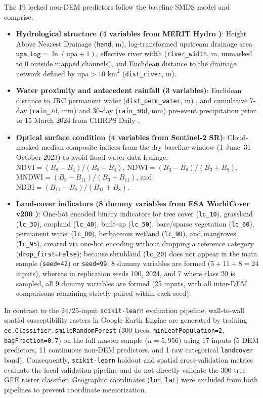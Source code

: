 \documentclass[11pt,twoside]{article}
\begin{document}
The 19 locked non-DEM predictors follow the baseline SMDS model \cite{hakim2026} and comprise:
\begin{itemize}
\item \textbf{Hydrological structure (4 variables from MERIT Hydro \cite{yamazaki2019})}: Height Above Nearest Drainage (\texttt{hand}, m), log-transformed upstream drainage area $\texttt{upa\_log} = \ln(\text{upa} + 1)$, effective river width (\texttt{river\_width}, m, unmasked to $0$ outside mapped channels), and Euclidean distance to the drainage network defined by $\text{upa} > 10\text{ km}^2$ (\texttt{dist\_river}, m).
\item \textbf{Water proximity and antecedent rainfall (3 variables)}: Euclidean distance to JRC permanent water (\texttt{dist\_perm\_water}, m) \cite{pekel2016}, and cumulative 7-day (\texttt{rain\_7d}, mm) and 30-day (\texttt{rain\_30d}, mm) pre-event precipitation prior to 15 March 2024 from CHIRPS Daily \cite{funk2015}.
\item \textbf{Optical surface condition (4 variables from Sentinel-2 SR)}: Cloud-masked median composite indices from the dry baseline window (1 June--31 October 2023) to avoid flood-water data leakage: $\text{NDVI} = (B_8 - B_4)/(B_8 + B_4)$, $\text{NDWI} = (B_3 - B_8)/(B_3 + B_8)$, $\text{MNDWI} = (B_3 - B_{11})/(B_3 + B_{11})$, and $\text{NDBI} = (B_{11} - B_8)/(B_{11} + B_8)$.
\item \textbf{Land-cover indicators (8 dummy variables from ESA WorldCover v200 \cite{zanaga2021})}: One-hot encoded binary indicators for tree cover (\texttt{lc\_10}), grassland (\texttt{lc\_30}), cropland (\texttt{lc\_40}), built-up (\texttt{lc\_50}), bare/sparse vegetation (\texttt{lc\_60}), permanent water (\texttt{lc\_80}), herbaceous wetland (\texttt{lc\_90}), and mangroves (\texttt{lc\_95}), created via one-hot encoding without dropping a reference category (\texttt{drop\_first=False}); because shrubland (\texttt{lc\_20}) does not appear in the main sample (\texttt{seed=42}) or \texttt{seed=99}, 8 dummy variables are formed ($5 + 11 + 8 = 24$ inputs), whereas in replication seeds 100, 2024, and 7 where class 20 is sampled, all 9 dummy variables are formed (25 inputs, with all inter-DEM comparisons remaining strictly paired within each seed).
\end{itemize}
In contrast to the 24/25-input \texttt{scikit-learn} evaluation pipeline, wall-to-wall spatial susceptibility rasters in Google Earth Engine are generated by training \texttt{ee.Classifier.smileRandomForest} (300 trees, \texttt{minLeafPopulation=2}, \texttt{bagFraction=0.7}) on the full master sample ($n = 5{,}956$) using 17 inputs (5 DEM predictors, 11 continuous non-DEM predictors, and 1 raw categorical \texttt{landcover} band). Consequently, \texttt{scikit-learn} holdout and spatial cross-validation metrics evaluate the local validation pipeline and do not directly validate the 300-tree GEE raster classifier. Geographic coordinates (\texttt{lon}, \texttt{lat}) were excluded from both pipelines to prevent coordinate memorization.
\end{document}
